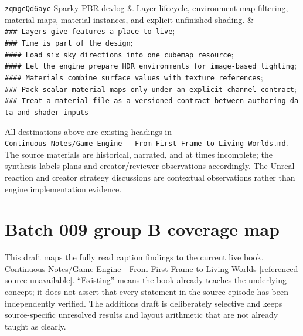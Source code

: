 {\begin{longtable}[]
\texttt{zqmgcQd6ayc} Sparky PBR devlog & Layer lifecycle, environment-map filtering, material maps, material instances, and explicit unfinished shading. & \texttt{\#\#\#\ Layers\ give\ features\ a\ place\ to\ live}; \texttt{\#\#\#\ Time\ is\ part\ of\ the\ design}; \texttt{\#\#\#\#\ Load\ six\ sky\ directions\ into\ one\ cubemap\ resource}; \texttt{\#\#\#\#\ Let\ the\ engine\ prepare\ HDR\ environments\ for\ image-based\ lighting}; \texttt{\#\#\#\#\ Materials\ combine\ surface\ values\ with\ texture\ references}; \texttt{\#\#\#\ Pack\ scalar\ material\ maps\ only\ under\ an\ explicit\ channel\ contract}; \texttt{\#\#\#\ Treat\ a\ material\ file\ as\ a\ versioned\ contract\ between\ authoring\ data\ and\ shader\ inputs} \\
\end{longtable}
}

All destinations above are existing headings in \texttt{Continuous\ Notes/Game\ Engine\ -\ From\ First\ Frame\ to\ Living\ Worlds.md}. The source materials are historical, narrated, and at times incomplete; the synthesis labels plans and creator/reviewer observations accordingly. The Unreal reaction and creator strategy discussions are contextual observations rather than engine implementation evidence.

\section{Batch 009 group B coverage map}\label{appendix-877738f6f4d2-batch-009-group-b-coverage-map}

This draft maps the fully read caption findings to the current live book, {Continuous Notes/Game Engine - From First Frame to Living Worlds {[}referenced source unavailable{]}}. ``Existing'' means the book already teaches the underlying concept; it does not assert that every statement in the source episode has been independently verified. The additions draft is deliberately selective and keeps source-specific unresolved results and layout arithmetic that are not already taught as clearly.

